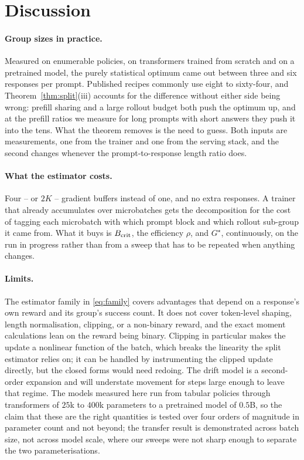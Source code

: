 \section{Discussion}
\label{sec:discussion}

\paragraph{Group sizes in practice.} Measured on enumerable policies, on transformers trained from
scratch and on a pretrained model, the purely statistical optimum came out between three and six
responses per prompt. Published recipes commonly use eight to sixty-four, and
Theorem~\ref{thm:split}(iii) accounts for the difference without either side being wrong: prefill
sharing and a large rollout budget both push the optimum up, and at the prefill ratios we measure
for long prompts with short answers they push it into the tens. What the theorem removes is the
need to guess. Both inputs are measurements, one from the trainer and one from the serving stack,
and the second changes whenever the prompt-to-response length ratio does.

\paragraph{What the estimator costs.} Four -- or $2K$ -- gradient buffers instead of one, and no
extra responses. A trainer that already accumulates over microbatches gets the decomposition for
the cost of tagging each microbatch with which prompt block and which rollout sub-group it came
from. What it buys is $B_{\mathrm{crit}}$, the efficiency $\rho$, and $G^{\star}$, continuously, on the run in
progress rather than from a sweep that has to be repeated when anything changes.

\paragraph{Limits.} The estimator family in \eqref{eq:family} covers advantages that depend on a
response's own reward and its group's success count. It does not cover token-level shaping, length
normalisation, clipping, or a non-binary reward, and the exact moment calculations lean on the
reward being binary. Clipping in particular makes the update a nonlinear function of the batch,
which breaks the linearity the split estimator relies on; it can be handled by instrumenting the
clipped update directly, but the closed forms would need redoing. The drift model is a second-order
expansion and will understate movement for steps large enough to leave that regime. The models measured here run from tabular policies through transformers of $25$k to $400$k
parameters to a pretrained model of $0.5$B, so the claim that these are the right quantities is
tested over four orders of magnitude in parameter count and not beyond; the transfer result is
demonstrated across batch size, not across model scale, where our sweeps were not sharp enough to
separate the two parameterisations.

